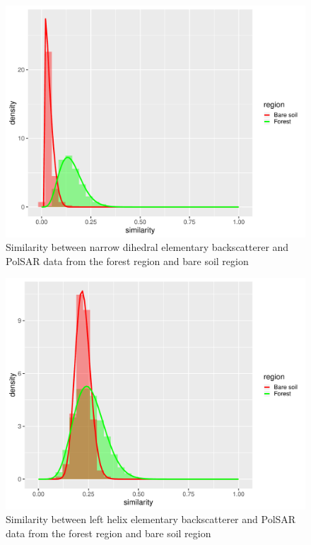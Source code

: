 \documentclass[conference]{IEEEtran}
\begin{document}
\begin{figure}[!ht]
    \centering
    \includegraphics[width = .9\linewidth, height = .7\linewidth]{../../../Figures/paper_19_05/nd.pdf}
    \caption{Similarity between narrow dihedral elementary backscatterer and PolSAR data from the forest region and bare soil region}
    \label{fig:nd}
\end{figure}

\begin{figure}[!ht]
    \centering
    \includegraphics[width = .9\linewidth, height = .7\linewidth]{../../../Figures/paper_19_05/lh.pdf}
    \caption{Similarity between left helix elementary backscatterer and PolSAR data from the forest region and bare soil region}
    \label{fig:lh}
\end{figure}
\end{document}
